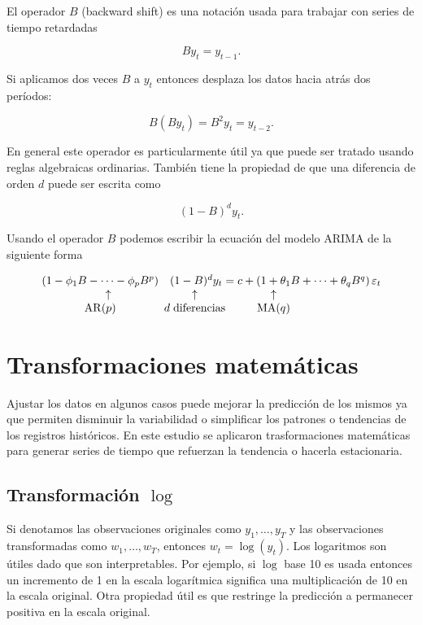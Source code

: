 El operador $B$ (backward shift) es una notación usada para trabajar con series de tiempo retardadas

\[ B y_{t}=y_{t-1}. \]

Si aplicamos dos veces $B$ a $y_t$ entonces desplaza los datos hacia atrás dos períodos: 

\[B\left(B y_{t}\right)=B^{2} y_{t}=y_{t-2}.\]

En general este operador es particularmente útil ya que puede ser tratado usando reglas algebraicas ordinarias. También tiene la propiedad de que una diferencia de orden $d$ puede ser escrita como

\[
(1-B)^{d} y_{t}.
\]

Usando el operador $B$ podemos escribir la ecuación del modelo ARIMA de la siguiente forma

\begin{equation*}
	\begin{array}{ccc}
		\left(1-\phi_{1} B-\cdots-\phi_{p} B^{p}\right) & (1-B)^{d} y_{t}=c+\left(1+\theta_{1} B+\cdots+\theta_{q} B^{q}\right) \varepsilon_{t}\\
		\hspace{0.5cm}\uparrow & \hspace{-5cm}\uparrow & \hspace{-7cm}\uparrow \\
		\operatorname{AR}(p) & \hspace{-5cm}d\hspace{0.1cm}\text{diferencias} & \hspace{-7cm}\operatorname{MA}(q)
	\end{array}
\end{equation*}
\section{Transformaciones matemáticas}
\label{transformacionesmatematicas}
Ajustar los datos en algunos casos puede mejorar la predicción de los mismos ya que permiten disminuir la variabilidad o simplificar los patrones o tendencias de los registros históricos. En este estudio se aplicaron trasformaciones matemáticas para generar series de tiempo que refuerzan la tendencia o hacerla estacionaria.


\subsection{Transformación $\log$}

Si denotamos las observaciones originales como $y_{1}, \ldots, y_{T}$ y las observaciones transformadas como $w_{1}, \ldots, w_{T}$, entonces $w_{t}=\log \left(y_{t}\right)$. Los logaritmos son útiles dado que son interpretables. Por ejemplo, si $\log$ base 10 es usada entonces un incremento de 1 en la escala logarítmica significa una multiplicación de 10 en la escala original.  
Otra propiedad útil es que restringe la predicción a permanecer positiva en la escala original. 

